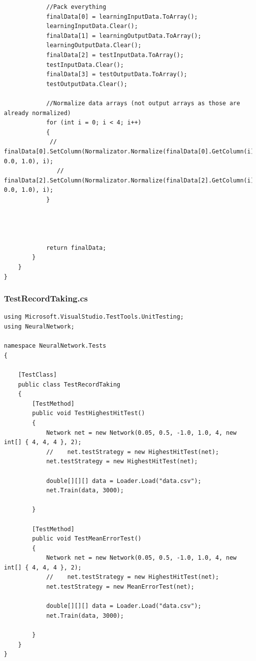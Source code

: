 \documentclass[12pt,a4paper]{article}
\begin{document}
\begin{lstlisting}
            //Pack everything 
            finalData[0] = learningInputData.ToArray();
            learningInputData.Clear();
            finalData[1] = learningOutputData.ToArray();
            learningOutputData.Clear();
            finalData[2] = testInputData.ToArray();
            testInputData.Clear();
            finalData[3] = testOutputData.ToArray();
            testOutputData.Clear();

            //Normalize data arrays (not output arrays as those are already normalized)
            for (int i = 0; i < 4; i++)
            {
             //   finalData[0].SetColumn(Normalizator.Normalize(finalData[0].GetColumn(i), 0.0, 1.0), i);
               // finalData[2].SetColumn(Normalizator.Normalize(finalData[2].GetColumn(i), 0.0, 1.0), i);
            }




            return finalData;
        }
    }
}\end{lstlisting}
\pagebreak


\subsubsection*{TestRecordTaking.cs}
\begin{lstlisting}
using Microsoft.VisualStudio.TestTools.UnitTesting;
using NeuralNetwork;

namespace NeuralNetwork.Tests
{

    [TestClass]
    public class TestRecordTaking
    {
        [TestMethod]
        public void TestHighestHitTest()
        {
            Network net = new Network(0.05, 0.5, -1.0, 1.0, 4, new int[] { 4, 4, 4 }, 2);
            //    net.testStrategy = new HighestHitTest(net);
            net.testStrategy = new HighestHitTest(net);

            double[][][] data = Loader.Load("data.csv");
            net.Train(data, 3000);

        }

        [TestMethod]
        public void TestMeanErrorTest()
        {
            Network net = new Network(0.05, 0.5, -1.0, 1.0, 4, new int[] { 4, 4, 4 }, 2);
            //    net.testStrategy = new HighestHitTest(net);
            net.testStrategy = new MeanErrorTest(net);

            double[][][] data = Loader.Load("data.csv");
            net.Train(data, 3000);

        }
    }
}
\end{lstlisting}
\pagebreak
\end{document}

